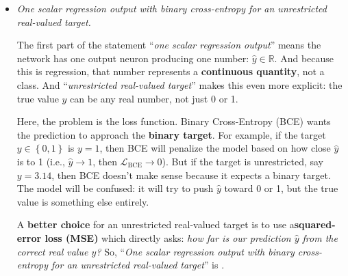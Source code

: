 \begin{itemize}
        Across many samples, averaging these squared errors gives the familiar  loss:
        \begin{equation*}
            \mathcal{L}_{\text{MSE}} = \frac{1}{N} \sum_{i=1}^{N} \left(y_i - \hat{y}_i\right)^2
        \end{equation*}
        Again, suppose we're predicting temperature:
        \begin{equation*}
            \text{sensor data} \to \text{neural network} \to \hat{y} \in \mathbb{R} \quad (\text{predicted temperature})
        \end{equation*}
        The task is scalar regression (predict one continuous number). We use a linear output neuron (allows unrestricted real-valued predictions) and during training we compare the prediction $\hat{y}$ with the true temperature $y$ using squared-error loss (measures numerical prediction error). Therefore:
        \begin{equation*}
            \text{Scalar regression} \to \text{Linear output} \to \text{Squared-error loss / MSE}
        \end{equation*}
        Is a  design choice.

    \item \emph{One scalar regression output with binary cross-entropy for an unrestricted real-valued target.}

        The first part of the statement ``\emph{one scalar regression output}'' means the network has one output neuron producing one number: $\hat{y} \in \mathbb{R}$. And because this is regression, that number represents a \textbf{continuous quantity}, not a class. And ``\emph{unrestricted real-valued target}'' makes this even more explicit: the true value $y$ can be any real number, not just 0 or 1.

        Here, the problem is the loss function. Binary Cross-Entropy (BCE) wants the prediction to approach the \textbf{binary target}. For example, if the target $y \in \left\{0, 1\right\}$ is $y = 1$, then BCE will penalize the model based on how close $\hat{y}$ is to 1 (i.e., $\hat{y} \to 1$, then $\mathcal{L}_{\text{BCE}} \to 0$). But if the target is unrestricted, say $y = 3.14$, then BCE doesn't make sense because it expects a binary target. The model will be confused: it will try to push $\hat{y}$ toward 0 or 1, but the true value is something else entirely.

        A \textbf{better choice} for an unrestricted real-valued target is to use a\break \textbf{squared-error loss (MSE)} which directly asks: \emph{how far is our prediction $\hat{y}$ from the correct real value $y$?} So, ``\emph{One scalar regression output with binary cross-entropy for an unrestricted real-valued target}'' is .
\end{itemize}

